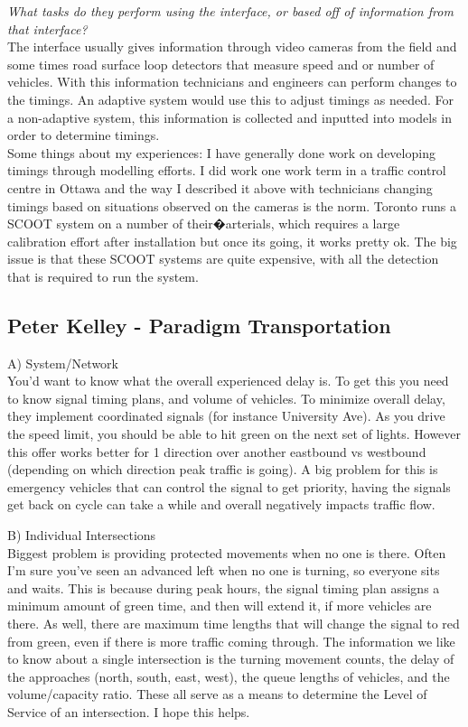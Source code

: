 \documentclass{report}
\begin{document}
\noindent \emph{What tasks do they perform using the interface, or based off of information from that interface?} \\
The interface usually gives information through video cameras from the field and some times road surface loop detectors that measure speed and or number of vehicles.
With this information technicians and engineers can perform changes to the timings.
An adaptive system would use this to adjust timings as needed.
For a non-adaptive system, this information is collected and inputted into models in order to determine timings. \\

Some things about my experiences:
I have generally done work on developing timings through modelling efforts. I did work one work term in a traffic control centre in Ottawa and the way I described it above with technicians changing timings based on situations observed on the cameras is the norm.
Toronto runs a SCOOT system on a number of their�arterials, which requires a large calibration effort after installation but once its going, it works pretty ok.
The big issue is that these SCOOT systems are quite expensive, with all the detection that is required to run the system.

\subsection{Peter Kelley - Paradigm Transportation}
A) System/Network \\
You'd want to know what the overall experienced delay is.
To get this you need to know signal timing plans, and volume of vehicles.
To minimize overall delay, they implement coordinated signals (for instance University Ave).
As you drive the speed limit, you should be able to hit green on the next set of lights.
However this offer works better for 1 direction over another eastbound vs westbound (depending on which direction peak traffic is going).
A big problem for this is emergency vehicles that can control the signal to get priority, having the signals get back on cycle can take a while and overall negatively impacts traffic flow.

\noindent B) Individual Intersections \\
Biggest problem is providing protected movements when no one is there.
Often I'm sure you've seen an advanced left when no one is turning, so everyone sits and waits.
This is because during peak hours, the signal timing plan assigns a minimum amount of green time, and then will extend it, if more vehicles are there.
As well, there are maximum time lengths that will change the signal to red from green, even if there is more traffic coming through.
The information we like to know about a single intersection is the turning movement counts, the delay of the approaches (north, south, east, west), the queue lengths of vehicles, and the volume/capacity ratio.
These all serve as a means to determine the Level of Service of an intersection.
I hope this helps.

\newpage
{}




\end{document}

